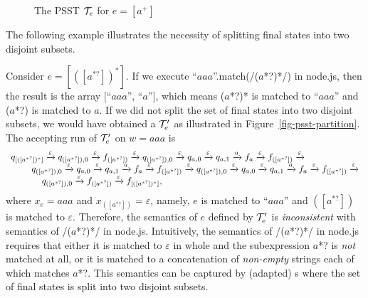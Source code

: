 \begin{example}
\begin{figure}[tb]
		\caption{The PSST $\mathcal{T}_e$ for $e = [a^+]$}
		\label{fig-pfa}
		\vspace{-4mm}
	\end{figure}
\end{example}


The following example illustrates the necessity of splitting final states into two disjoint subsets.

\begin{example}\label{exmp-psst-partition}
Consider {\pcre} $e = [([a^{*?}])^{*}]$. If we execute ``$aaa$''.match(/($a$*?)*/)  in node.js, then 
the result is the array $[$``$aaa$'', ``$a$''$]$, which means ($a$*?)* is matched to ``$aaa$'' and ($a$*?) is matched to $a$. If we did not split the set of final states into two disjoint subsets, we would have obtained a {\PSST} $\mathcal{T}^\prime_e$ as illustrated in Figure~\ref{fig-psst-partition}. The accepting run of $\mathcal{T}^\prime_e$ on $w  = aaa$ is 
%
$$
\begin{array}{l}
q_{[([a^{*?}])^{*}]} \xrightarrow{\varepsilon} 
q_{([a^{*?}]), 0} \xrightarrow{\varepsilon} 
f_{([a^{*?}])} \xrightarrow{\varepsilon} 
q_{([a^{*?}]), 0} \xrightarrow{\varepsilon} 
q_{a, 0} \xrightarrow{\varepsilon}
q_{a, 1} \xrightarrow{a} 
f_a \xrightarrow{\varepsilon} 
f_{([a^{*?}])} \xrightarrow{\varepsilon} 
\\
\hspace*{8mm} 
q_{([a^{*?}]), 0} \xrightarrow{\varepsilon} 
q_{a, 0} \xrightarrow{\varepsilon} 
q_{a, 1} \xrightarrow{a} 
f_a \xrightarrow{\varepsilon} 
f_{([a^{*?}])} \xrightarrow{\varepsilon} 
q_{([a^{*?}]), 0} \xrightarrow{\varepsilon} 
q_{a, 0} \xrightarrow{\varepsilon} 
q_{a, 1} \xrightarrow{a} 
f_a \xrightarrow{\varepsilon} 
f_{([a^{*?}])} \xrightarrow{\varepsilon} 
\\
\hspace*{12mm} 
q_{([a^{*?}]), 0} \xrightarrow{\varepsilon} 
f_{([a^{*?}])} \xrightarrow{\varepsilon} 
f_{[([a^{*?}])^*]},
\end{array}
$$
where $x_{e} = aaa$ and $ x_{([a^{*?}])} = \varepsilon$, namely, $e $ is matched to ``$aaa$''  and  $([a^{*?}])$ is matched to $\varepsilon$. Therefore, the semantics of $e$ defined by $\mathcal{T}^\prime_e$  is \emph{inconsistent} with semantics of /($a$*?)*/ in node.js. Intuitively, the semantics of /($a$*?)*/ in node.js requires that either it is matched to $\varepsilon$ in whole and the subexpression $a$*? is \emph{not} matched at all, or it is matched to a concatenation of \emph{non-empty} strings each of which matches $a$*?. This semantics can be captured by (adapted) {\PSST}s where the set of final states is split into two disjoint subsets.

\end{example}
